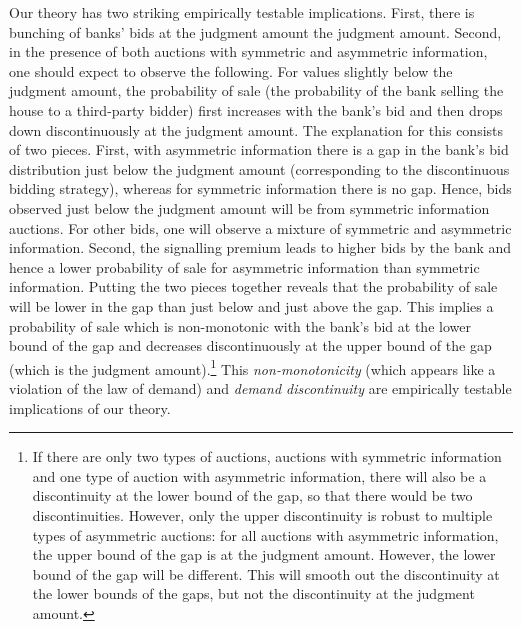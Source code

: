 \documentclass[11pt,twopage]{article}
\begin{document}
Our theory has two striking empirically testable implications. First,
there is bunching of banks' bids at the judgment amount the judgment
amount. Second, in the presence of both auctions with symmetric and
asymmetric information, one should expect to observe the
following. For values slightly below the judgment amount, the
probability of sale (the probability of the bank selling the house to
a third-party bidder) first increases with the bank's bid and then
drops down discontinuously at the judgment amount. The explanation for
this consists of two pieces. First, with asymmetric information there
is a gap in the bank's bid distribution just below the judgment amount
(corresponding to the discontinuous bidding strategy), whereas for
symmetric information there is no gap. Hence, bids observed just below
the judgment amount will be from symmetric information auctions. For
other bids, one will observe a mixture of symmetric and asymmetric
information. Second, the signalling premium leads to higher bids by
the bank and hence a lower probability of sale for asymmetric
information than symmetric information. Putting the two pieces
together reveals that the probability of sale will be lower in the gap
than just below and just above the gap. This implies a probability of
sale which is non-monotonic with the bank's bid at the lower bound of
the gap and decreases discontinuously at the upper bound of the gap
(which is the judgment amount).\footnote{If there are only two types
  of auctions, auctions with symmetric information and one type of
  auction with asymmetric information, there will also be a
  discontinuity at the lower bound of the gap, so that there would be
  two discontinuities. However, only the upper discontinuity is robust
  to multiple types of asymmetric auctions: for all auctions with
  asymmetric information, the upper bound of the gap is at the
  judgment amount. However, the lower bound of the gap will be
  different. This will smooth out the discontinuity at the lower
  bounds of the gaps, but not the discontinuity at the judgment
  amount.} This \emph{non-monotonicity} (which appears like a
violation of the law of demand) and \emph{demand discontinuity} are
empirically testable implications of our theory.
\end{document}
